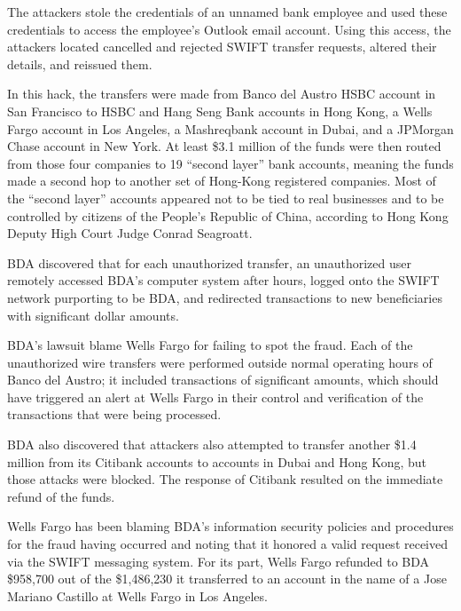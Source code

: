 \documentclass[12pt]{article}
\begin{document}
        The attackers stole the credentials of an unnamed bank employee and used these credentials to access the employee’s Outlook email account. Using this access, the attackers located cancelled and rejected SWIFT transfer requests, altered their details, and reissued them.
        
        In this hack, the transfers were made from Banco del Austro HSBC account in San Francisco to HSBC and Hang Seng Bank accounts in Hong Kong, a Wells Fargo account in Los Angeles, a Mashreqbank account in Dubai, and a JPMorgan Chase account in New York.
        At least \$3.1 million of the funds were then routed from those four companies to 19 “second layer” bank accounts, meaning the funds made a second hop to another set of Hong-Kong registered companies. Most of the “second layer” accounts appeared not to be tied to real businesses and to be controlled by citizens of the People’s Republic of China, according to Hong Kong Deputy High Court Judge Conrad Seagroatt.
        
        BDA discovered that for each unauthorized transfer, an unauthorized user remotely accessed BDA's computer system after hours, logged onto the SWIFT network purporting to be BDA, and redirected transactions to new beneficiaries with significant dollar amounts. 

        BDA's lawsuit blame Wells Fargo for failing to spot the fraud. Each of the unauthorized wire transfers were performed outside normal operating hours of Banco del Austro; it included transactions of significant amounts, which should have triggered an alert at Wells Fargo in their control and verification of the transactions that were being processed.

        BDA also discovered that attackers also attempted to transfer another \$1.4 million from its Citibank accounts to accounts in Dubai and Hong Kong, but those attacks were blocked. The response of Citibank resulted on the immediate refund of the funds.

        Wells Fargo has been blaming BDA's information security policies and procedures for the fraud having occurred and noting that it honored a valid request received via the SWIFT messaging system. For its part, Wells Fargo refunded to BDA \$958,700 out of the \$1,486,230 it transferred to an account in the name of a Jose Mariano Castillo at Wells Fargo in Los Angeles.\cite{AnotherSWIFTHack}\cite{EcuadorBankHacked}\cite{ExclusiveEcuadorCyber2016}\cite{SpecialReportCyber2016}
        
\end{document}
